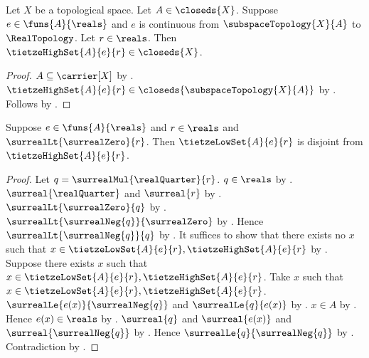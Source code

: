 \begin{corollary}\label{tietze_high_set_closed}
    Let $X$ be a topological space.
    Let $A\in\closeds{X}$.
    Suppose $e\in\funs{A}{\reals}$ and
        $e$ is continuous from $\subspaceTopology{X}{A}$ to
            $\RealTopology$.
    Let $r\in\reals$.
    Then $\tietzeHighSet{A}{e}{r}\in\closeds{X}$.
\end{corollary}
\begin{proof}
    $A\subseteq\carrier[X]$ by .
    $\tietzeHighSet{A}{e}{r}
        \in\closeds{\subspaceTopology{X}{A}}$
        by .
    Follows by .
\end{proof}

\begin{proposition}\label{tietze_low_high_disjoint}
    Suppose $e\in\funs{A}{\reals}$ and $r\in\reals$ and
        $\surrealLt{\surrealZero}{r}$.
    Then $\tietzeLowSet{A}{e}{r}$ is disjoint from
        $\tietzeHighSet{A}{e}{r}$.
\end{proposition}
\begin{proof}
    Let $q=\surrealMul{\realQuarter}{r}$.
    $q\in\reals$
        by .
    $\surreal{\realQuarter}$ and $\surreal{r}$
        by
        .
    $\surrealLt{\surrealZero}{q}$
        by .
    $\surrealLt{\surrealNeg{q}}{\surrealZero}$
        by
        .
    Hence $\surrealLt{\surrealNeg{q}}{q}$
        by
        .
    It suffices to show that there exists no $x$ such that
        $x\in\tietzeLowSet{A}{e}{r},\tietzeHighSet{A}{e}{r}$
        by .
    Suppose there exists $x$ such that
        $x\in\tietzeLowSet{A}{e}{r},\tietzeHighSet{A}{e}{r}$.
    Take $x$ such that
        $x\in\tietzeLowSet{A}{e}{r},\tietzeHighSet{A}{e}{r}$.
    $\surrealLe{e(x)}{\surrealNeg{q}}$ and
        $\surrealLe{q}{e(x)}$
        by .
    $x\in A$ by .
    Hence $e(x)\in\reals$ by .
    $\surreal{q}$ and $\surreal{e(x)}$ and $\surreal{\surrealNeg{q}}$
        by
        .
    Hence $\surrealLe{q}{\surrealNeg{q}}$
        by .
    Contradiction by
        .
\end{proof}

